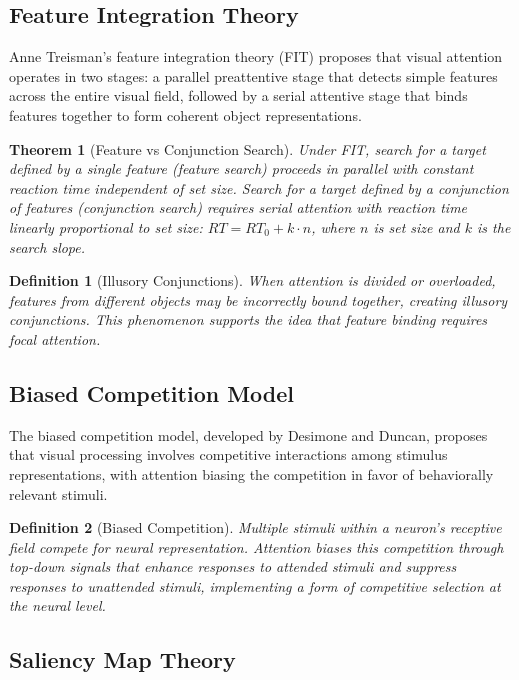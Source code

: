 \documentclass[a4paper, 11pt]{article}
\newtheorem{definition}{Definition}[section]
\newtheorem{theorem}{Theorem}[section]
\begin{document}
\subsection{Feature Integration Theory}

Anne Treisman's feature integration theory (FIT) proposes that visual attention operates in two stages: a parallel preattentive stage that detects simple features across the entire visual field, followed by a serial attentive stage that binds features together to form coherent object representations.

\begin{theorem}[Feature vs Conjunction Search]
Under FIT, search for a target defined by a single feature (feature search) proceeds in parallel with constant reaction time independent of set size. Search for a target defined by a conjunction of features (conjunction search) requires serial attention with reaction time linearly proportional to set size: $RT = RT_0 + k \cdot n$, where $n$ is set size and $k$ is the search slope.
\end{theorem}

\begin{definition}[Illusory Conjunctions]
When attention is divided or overloaded, features from different objects may be incorrectly bound together, creating illusory conjunctions. This phenomenon supports the idea that feature binding requires focal attention.
\end{definition}

\subsection{Biased Competition Model}

The biased competition model, developed by Desimone and Duncan, proposes that visual processing involves competitive interactions among stimulus representations, with attention biasing the competition in favor of behaviorally relevant stimuli.

\begin{definition}[Biased Competition]
Multiple stimuli within a neuron's receptive field compete for neural representation. Attention biases this competition through top-down signals that enhance responses to attended stimuli and suppress responses to unattended stimuli, implementing a form of competitive selection at the neural level.
\end{definition}

\subsection{Saliency Map Theory}
\end{document}
